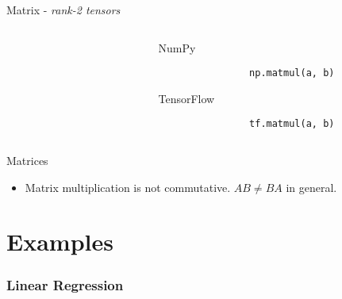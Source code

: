 \documentclass[handout]{beamer}
\begin{document}
\begin{frame}[fragile]{Matrix - \textit{rank-2 tensors}}
    \begin{columns}
        \begin{column}{0.5\textwidth}
            \begin{figure}[htb]
                \centering
                \resizebox{5cm}{6cm}{
                    
                }
                \label{fig:matmul}
            \end{figure}
        \end{column}
        \begin{column}{0.5\textwidth}
            \begin{alertblock}{NumPy}
                \begin{lstlisting}
                np.matmul(a, b)
                \end{lstlisting}
            \end{alertblock}
            \begin{alertblock}{TensorFlow}
                \begin{lstlisting}
                tf.matmul(a, b)
                \end{lstlisting}
            \end{alertblock}
        \end{column}
    \end{columns}
\end{frame}


\begin{frame}[fragile]{Matrices}
    \begin{itemize}
        \item Matrix multiplication is not commutative. $AB \neq BA$ in general.
    \end{itemize}
\end{frame}




\section{Examples}
\begin{frame}[fragile]
    \frametitle{Linear Regression}
    \begin{figure}[htb]
        \centering
        
        \label{fig:regression}
	\end{figure}
\end{frame}
\end{document}
